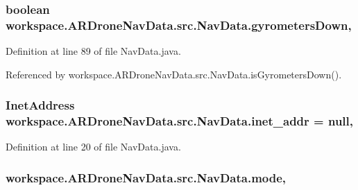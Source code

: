 \subsubsection[{gyrometers\+Down}]{\setlength{\rightskip}{0pt plus 5cm}boolean workspace.\+A\+R\+Drone\+Nav\+Data.\+src.\+Nav\+Data.\+gyrometers\+Down\hspace{0.3cm}{\ttfamily [static]}, {\ttfamily [protected]}}\label{classworkspace_1_1_a_r_drone_nav_data_1_1src_1_1_nav_data_a4b0b866b9671601dddc329740b7e102f}


Definition at line 89 of file Nav\+Data.\+java.



Referenced by workspace.\+A\+R\+Drone\+Nav\+Data.\+src.\+Nav\+Data.\+is\+Gyrometers\+Down().

\hypertarget{classworkspace_1_1_a_r_drone_nav_data_1_1src_1_1_nav_data_a822661933201f8b0c1c6da6919b62b81}{}
\subsubsection[{inet\+\_\+addr}]{\setlength{\rightskip}{0pt plus 5cm}Inet\+Address workspace.\+A\+R\+Drone\+Nav\+Data.\+src.\+Nav\+Data.\+inet\+\_\+addr = null\hspace{0.3cm}{\ttfamily [static]}, {\ttfamily [private]}}\label{classworkspace_1_1_a_r_drone_nav_data_1_1src_1_1_nav_data_a822661933201f8b0c1c6da6919b62b81}


Definition at line 20 of file Nav\+Data.\+java.

\hypertarget{classworkspace_1_1_a_r_drone_nav_data_1_1src_1_1_nav_data_a60cc1aab4d441d6d3467bfa777c85783}{}
\subsubsection[{mode}]{ workspace.\+A\+R\+Drone\+Nav\+Data.\+src.\+Nav\+Data.\+mode\hspace{0.3cm}{\ttfamily [static]}, {\ttfamily [protected]}}\label{classworkspace_1_1_a_r_drone_nav_data_1_1src_1_1_nav_data_a60cc1aab4d441d6d3467bfa777c85783}


